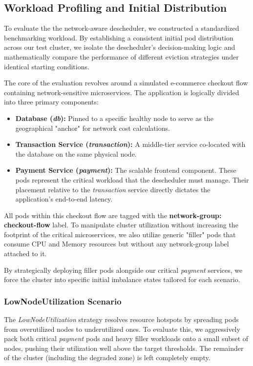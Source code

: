\subsection{Workload Profiling and Initial Distribution}
\label{subsec:netaware4_workloadprofiling}

To evaluate the the network-aware descheduler, we constructed a standardized benchmarking workload. By establishing a consistent initial pod distribution across our test cluster, we isolate the descheduler's decision-making logic and mathematically compare the performance of different eviction strategies under identical starting conditions.

The core of the evaluation revolves around a simulated e-commerce checkout flow containing network-sensitive microservices. The application is logically divided into three primary components:

\begin{itemize}
    \item \textbf{Database (\textit{db}):} Pinned to a specific healthy node to serve as the geographical "anchor" for network cost calculations.
    \item \textbf{Transaction Service (\textit{transaction}):} A middle-tier service co-located with the database on the same physical node.
    \item \textbf{Payment Service (\textit{payment}):} The scalable frontend component. These pods represent the critical workload that the descheduler must manage. Their placement relative to the \textit{transaction} service directly dictates the application's end-to-end latency.
\end{itemize}

All pods within this checkout flow are tagged with the \textbf{network-group: checkout-flow} label. To manipulate cluster utilization without increasing the footprint of the critical microservices, we also utilize generic "filler" pods that consume CPU and Memory resources but without any network-group label attached to it.

By strategically deploying filler pods alongside our critical \textit{payment} services, we force the cluster into specific initial imbalance states tailored for each scenario.

\subsubsection{LowNodeUtilization Scenario}
\label{subsubsec:netaware4_workload_lownode}
The \textit{LowNodeUtilization} strategy resolves resource hotspots by spreading pods from overutilized nodes to underutilized ones. To evaluate this, we aggressively pack both critical \textit{payment} pods and heavy filler workloads onto a small subset of nodes, pushing their utilization well above the target thresholds. The remainder of the cluster (including the degraded zone) is left completely empty.

